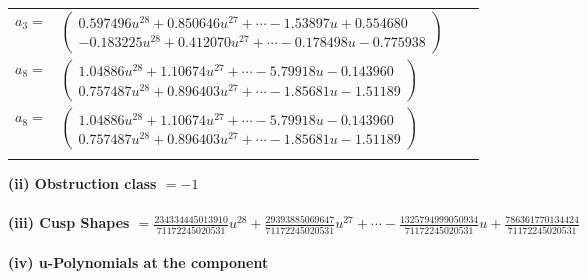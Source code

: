\documentclass[1p]{elsarticle_modified}
\theoremstyle{definition}
\begin{document}
\begin{tabular}{m{7pt} m{180pt} m{7pt} m{180pt} }
\flushright $a_{3}=$&$\begin{pmatrix}0.597496 u^{28}+0.850646 u^{27}+\cdots-1.53897 u+0.554680\\-0.183225 u^{28}+0.412070 u^{27}+\cdots-0.178498 u-0.775938\end{pmatrix}$ \\
\flushright $a_{8}=$&$\begin{pmatrix}1.04886 u^{28}+1.10674 u^{27}+\cdots-5.79918 u-0.143960\\0.757487 u^{28}+0.896403 u^{27}+\cdots-1.85681 u-1.51189\end{pmatrix}$\\ \flushright $a_{8}=$&$\begin{pmatrix}1.04886 u^{28}+1.10674 u^{27}+\cdots-5.79918 u-0.143960\\0.757487 u^{28}+0.896403 u^{27}+\cdots-1.85681 u-1.51189\end{pmatrix}$\\&\end{tabular}
\flushleft \textbf{(ii) Obstruction class $= -1$}\\~\\
\flushleft \textbf{(iii) Cusp Shapes $= \frac{234334445013910}{71172245020531} u^{28}+\frac{29393885069647}{71172245020531} u^{27}+\cdots-\frac{1325794999050934}{71172245020531} u+\frac{786361770134424}{71172245020531}$}\\~\\
\newpage\renewcommand{\arraystretch}{1}
\flushleft \textbf{(iv) u-Polynomials at the component}\newline \\
\end{document}
